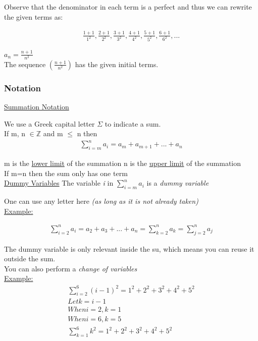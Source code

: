 \documentclass{article}
\begin{document}
Observe that the denominator in each term is a perfect and thus we can rewrite the given terms as:

\begin{align}
\frac{1+1}{1^{2}}, \frac{2+1}{2^{2}}, \frac{3+1}{3^{2}}, \frac{4+1}{4^{2}}, \frac{5+1}{5^{2}}, \frac{6+1}{6^{2}}, ...
\end{align}

$a_{n} = \frac{n+1}{n^{2}}$ \\

The sequence $(\frac{n+1}{n^{2}})$ has the given initial terms.

\subsubsection{Notation}

\underline{Summation Notation}

We use a Greek capital letter $\Sigma$ to indicate a sum. \\

If m, n $\in \mathbb{Z}$ and m $\leq$ n then
\begin{align}
\sum_{i=m}^{n} a_{i} = a_{m} + a_{m+1} + ... + a_{n}
\end{align}

m is the \underline{lower limit} of the summation
n is the \underline{upper limit} of the summation \\

If m=n then the sum only has one term \\

\underline{Dummy Variables}
The variable \textit{i} in $\sum_{i=m}^{n} a_{i}$ is a \textit{dummy variable}

One can use any letter here \textit{(as long as it is not already taken)} \\

\underline{Example:}

\begin{align}
\sum_{i=2}^{n} a_{i} = a_{2} + a_{3} + ... + a_{n} = \sum_{k=2}^{n} a_{k} = \sum_{j=2}^{n} a_{j}
\end{align}

The dummy variable is only relevant inside the su, which means you can reuse it outside the sum. \\

You can also perform a \textit{change of variables} \\

\underline{Example:}
\begin{align}
\sum_{i=2}^{6} (i-1)^{2} = 1^{2} + 2^{2} + 3^{2} + 4^{2} + 5^{2} \\
Let k = i-1 \\
When i = 2, k = 1 \\
When i = 6, k = 5 \\
\sum_{k=1}^{6} k^{2} = 1^{2} + 2^{2} + 3^{2} + 4^{2} + 5^{2} \\
\end{align}
\end{document}

